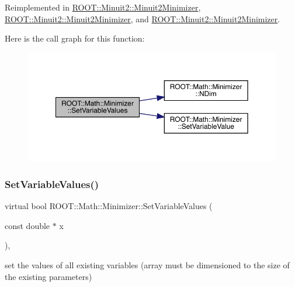Reimplemented in \mbox{\hyperlink{classROOT_1_1Minuit2_1_1Minuit2Minimizer_a9511e9711f3d1505556af30046c87d03}{R\+O\+O\+T\+::\+Minuit2\+::\+Minuit2\+Minimizer}}, \mbox{\hyperlink{classROOT_1_1Minuit2_1_1Minuit2Minimizer_a9511e9711f3d1505556af30046c87d03}{R\+O\+O\+T\+::\+Minuit2\+::\+Minuit2\+Minimizer}}, and \mbox{\hyperlink{classROOT_1_1Minuit2_1_1Minuit2Minimizer_a9511e9711f3d1505556af30046c87d03}{R\+O\+O\+T\+::\+Minuit2\+::\+Minuit2\+Minimizer}}.

Here is the call graph for this function\+:
\nopagebreak
\begin{figure}[H]
\begin{center}
\leavevmode
\includegraphics[width=350pt]{dc/dc4/classROOT_1_1Math_1_1Minimizer_ac8368efbd59da8e0b8bc0a0966309609_cgraph}
\end{center}
\end{figure}
\mbox{\label{classROOT_1_1Math_1_1Minimizer_ac8368efbd59da8e0b8bc0a0966309609}} 
\subsubsection{\texorpdfstring{SetVariableValues()}{SetVariableValues()}\hspace{0.1cm}{\footnotesize\ttfamily [2/3]}}
{\footnotesize\ttfamily virtual bool R\+O\+O\+T\+::\+Math\+::\+Minimizer\+::\+Set\+Variable\+Values (\begin{DoxyParamCaption}\item[{const double $\ast$}]{x }\end{DoxyParamCaption})\hspace{0.3cm}{\ttfamily [inline]}, {\ttfamily [virtual]}}



set the values of all existing variables (array must be dimensioned to the size of the existing parameters) 




